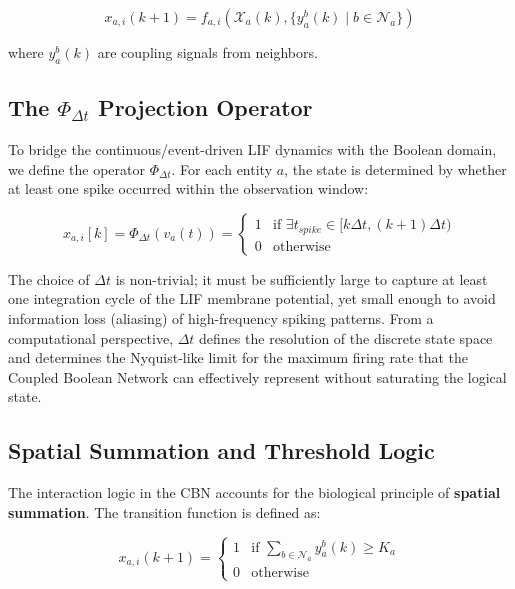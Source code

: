 \documentclass[10pt, conference]{IEEEtran}
\begin{document}
\begin{equation}
    x_{a,i}(k+1) = f_{a,i}(\mathcal{X}_a(k), \{y^b_a(k) \mid b \in \mathcal{N}_a\})
\end{equation}

where $y^b_a(k)$ are coupling signals from neighbors.


\subsection{The $\Phi_{\Delta t}$ Projection Operator}

To bridge the continuous/event-driven LIF dynamics with the Boolean domain, we define the operator $\Phi_{\Delta t}$. For each entity $a$, the state is determined by whether at least one spike occurred within the observation window:

\begin{equation}
    x_{a,i}[k] = \Phi_{\Delta t} (v_a(t)) = 
    \begin{cases} 
    1 & \text{if } \exists t_{spike} \in [k\Delta t, (k+1)\Delta t) \\
    0 & \text{otherwise}
    \end{cases}
\end{equation}

The choice of $\Delta t$ is non-trivial; it must be sufficiently large to capture at least one integration cycle of the LIF membrane potential, yet small enough to avoid information loss (aliasing) of high-frequency spiking patterns. From a computational perspective, $\Delta t$ defines the resolution of the discrete state space and determines the Nyquist-like limit for the maximum firing rate that the Coupled Boolean Network can effectively represent without saturating the logical state.


\subsection{Spatial Summation and Threshold Logic}

The interaction logic in the CBN accounts for the biological principle of \textbf{spatial summation}. The transition function is defined as:

\begin{equation}
    x_{a,i}(k+1) = 
    \begin{cases} 
    1 & \text{if } \sum_{b \in \mathcal{N}_a} y^b_a(k) \geq K_a \\
    0 & \text{otherwise}
    \end{cases}
\end{equation}
\end{document}
